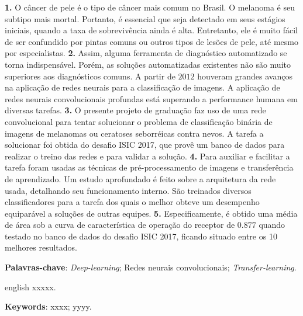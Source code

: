 \begin{resumo}
\textbf{1. }
O câncer de pele é o tipo de câncer mais comum no Brasil. 
O melanoma é seu subtipo mais mortal. 
Portanto, é essencial que seja detectado em seus estágios iniciais, quando a taxa de sobrevivência ainda é alta. 
Entretanto, ele é muito fácil de ser confundido por pintas comuns ou outros tipos de lesões de pele, até mesmo por especialistas. 
\textbf{2. }
Assim, alguma ferramenta de diagnóstico automatizado se torna indispensável. 
Porém, as soluções automatizadas existentes não são muito superiores aos diagnósticos comuns. 
A partir de $2012$ houveram grandes avanços na aplicação de redes neurais para a classificação de imagens. 
A aplicação de redes neurais convolucionais profundas está superando a performance humana em diversas tarefas. 
\textbf{3. }
O presente projeto de graduação faz uso de uma rede convolucional para tentar solucionar o problema de classificação binária de imagens de melanomas ou ceratoses seborréicas contra nevos. 
A tarefa a solucionar foi obtida do desafio ISIC 2017, que provê um banco de dados para realizar o treino das redes e para validar a solução. 
\textbf{4. }
Para auxiliar e facilitar a tarefa foram usadas as técnicas de pré-processamento de imagens e transferência de aprendizado. 
Um estudo aprofundado é feito sobre a arquitetura da rede usada, detalhando seu funcionamento interno. São treinados diversos classificadores para a tarefa dos quais o melhor obteve um desempenho equiparável a soluções de outras equipes. 
\textbf{5. }
Especificamente, é obtido uma média de área sob a curva de característica de operação do receptor de $0.877$ quando testado no banco de dados do desafio ISIC 2017, ficando situado entre os 10 melhores resultados.

\textbf{Palavras-chave}: \textit{Deep-learning}; Redes neurais convolucionais; \textit{Transfer-learning}.
\end{resumo}

\begin{resumo}[Abstract]
 \begin{otherlanguage*}{english}
   \noindent xxxxx.
   
   \textbf{Keywords}: xxxx; yyyy.
 \end{otherlanguage*}
\end{resumo}
